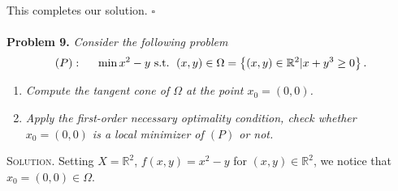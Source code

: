 \documentclass[a4paper]{article}
\numberwithin{equation}{section}
\begin{document}
This completes our solution. \hfill $\square$\\
\\
\textbf{Problem 9.} \textit{Consider the following problem}
\begin{align}
\left( P \right):\hspace{0.5cm}\min {x^2} - y\mbox{ s.t. } \left( {x,y} \right) \in \Omega  = \left\{ {\left( {x,y} \right) \in {\mathbb{R}^2}|x + {y^3} \ge 0} \right\}.
\end{align}
\begin{enumerate}
\item \textit{Compute the tangent cone of $\Omega$ at the point $x_0=\left(0,0\right)$.}
\item \textit{Apply the first-order necessary optimality condition, check whether $x_0=\left(0,0\right)$ is a local minimizer of $\left(P\right)$ or not.}
\end{enumerate}
\textsc{Solution.} Setting $X=\mathbb{R}^2$, $f\left(x,y\right)=x^2-y$ for $\left(x,y\right)\in \mathbb{R}^2$, we notice that $x_0=\left(0,0\right)\in \Omega$. 
\end{document}
